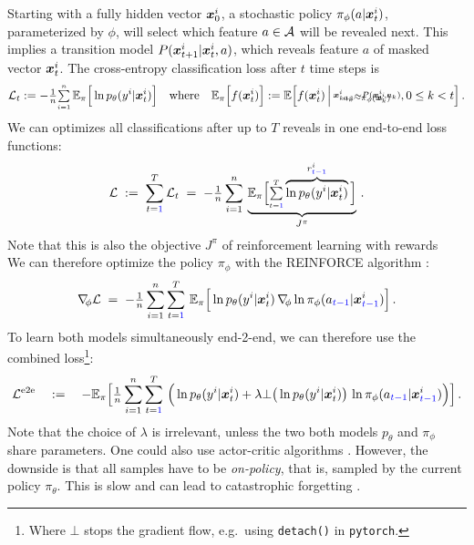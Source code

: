 Starting with a fully hidden vector $\bm x^i_0$, 
a stochastic policy $\pi_\phi(a|\bm x^i_t)$, parameterized by $\phi$,
will select which feature $a \in \mathcal{A}$ will be revealed next.
This implies a transition model $P(\bm x^i_{t+1}|\bm x^i_{t}, a)$, 
which reveals feature $a$ of masked vector $\bm x^i_t$.
The cross-entropy classification loss after $t$ time steps is
\begin{align}
	\Set L_t := -\smallfrac{1}{n} \smallsum{i=1}{n}\,  
	\E_\pi\Big[ \ln p_\theta(y^i|\ve x^i_t) \Big]
	\quad \text{where} \quad
	\E_\pi\Big[f(\ve x^i_t)\Big] := \E\Big[ f(\ve x^i_t) \,\Big|
		\stack{
		a_k \sim \pi_\phi(\ve x_k^i)
		\brs[-5mm]
		\ve x^i_{k+1} \sim P(\ve x^i_k, a_k)
		}\!, 0 \leq k < t
	\Big] \,.
\end{align}
We can optimizes all classifications after up to $T$ reveals 
in one end-to-end loss functions:
\begin{align}
	\mathcal{L} \;:=\; \sum_{t={\color{blue}1}}^T \mathcal{L}_t \;=\; 
	-{\textstyle \frac{1}{n}} \sum_{i=1}^{n}\,  
	\underbrace{\mathbb{E}_\pi\Big[ {\textstyle \sum\limits_{\scriptscriptstyle t={\color{blue}1}}^{\scriptscriptstyle T}} 
		\overbrace{\ln p_\theta(y^i| \bm x^i_t)}^{r^i_{\color{blue}t-1}} 
	\Big]}_{J^\pi} \,.
\end{align}
Note that this is also the objective $J^\pi$ of reinforcement learning
with rewards
 ~
We can therefore optimize the policy $\pi_\phi$
with the REINFORCE algorithm \citep{Williams92}:
\begin{align}
	\nabla\kern-0.5ex_{\phi} \mathcal{L} \;=\; 
	-{\textstyle \frac{1}{n}} \sum_{i=1}^{n} \sum_{t={\color{blue}1}}^{T}\,  
	\mathbb{E}_\pi\Big[ 
		\ln p_\theta(y^i| \bm x^i_t)  \,
		\nabla\kern-0.5ex_{\phi} \ln \pi_\phi(a_{\color{blue}t-1}| \bm x^i_{\color{blue}t-1}) \Big] \,.
\end{align}
To learn both models simultaneously end-2-end, we can therefore use the 
combined loss\footnote{Where $\bot$ stops the gradient flow,
	e.g.~using \texttt{detach()} in \texttt{pytorch}.}:
\begin{align}
	\mathcal{L}^\text{e2e} \quad:=\quad
	- \mathbb{E}_\pi\Big[
	{\textstyle \frac{1}{n}} \sum_{i=1}^{n} \sum_{t={\color{blue}1}}^{T}\,  \Big(
	 \ln p_\theta(y^i| \bm x^i_t) 
	+ \lambda \bot\big(\ln p_\theta(y^i| \bm x^i_t)\big)  \,
		\ln \pi_\phi(a_{\color{blue}t-1}| \bm x^i_{\color{blue}t-1}) \Big) \Big]\,.	
\end{align}
Note that the choice of $\lambda$ is irrelevant, 
unless the two both models $p_\theta$ and $\pi_\phi$ share parameters.
One could also use actor-critic algorithms \citep{Sutton00}.
However, the downside is that all samples have to be 
{\em on-policy}, that is, sampled by the current policy $\pi_\theta$.
This is slow and can lead to catastrophic forgetting
\citep[which can be counteracted by modern 
algorithms,][but this is another story]{Schulman15, Schulman17}.


